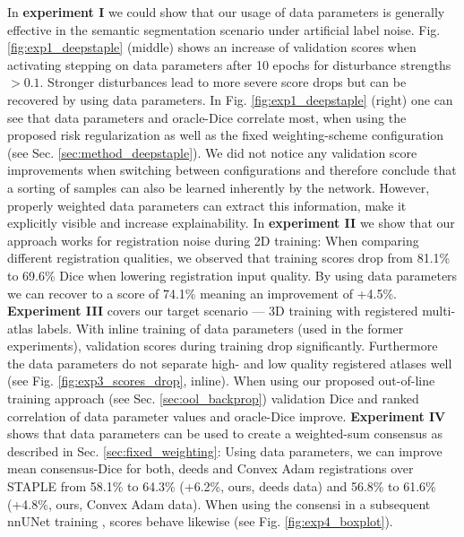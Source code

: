     \label{sec:results}
    In \textbf{experiment I} we could show that our usage of data parameters is generally effective in the semantic segmentation scenario under artificial label noise.
    Fig. \ref{fig:exp1_deepstaple} (middle) shows an increase of validation scores when activating stepping on data parameters after 10 epochs for disturbance strengths \(>0.1\). Stronger disturbances lead to more severe score drops but can be recovered by using data parameters.
    In Fig. \ref{fig:exp1_deepstaple} (right) one can see that data parameters and oracle-Dice correlate most, when using the proposed risk regularization as well as the fixed weighting-scheme configuration (see Sec. \ref{sec:method_deepstaple}). We did not notice any validation score improvements when switching between configurations and therefore conclude that a sorting of samples can also be learned inherently by the network. However, properly weighted data parameters can extract this information, make it explicitly visible and increase explainability.
    In \textbf{experiment II} we show that our approach works for registration noise during 2D training: When comparing different registration qualities, we observed that training scores drop from 81.1\% to 69.6\% Dice when lowering registration input quality. By using data parameters we can recover to a score of 74.1\% meaning an improvement of +4.5\%.
    \textbf{Experiment III} covers our target scenario --- 3D training with registered multi-atlas labels. With inline training of data parameters (used in the former experiments), validation scores during training drop significantly. Furthermore the data parameters do not separate high- and low quality registered atlases well (see Fig. \ref{fig:exp3_scores_drop}, inline). When using our proposed out-of-line training approach (see Sec. \ref{sec:ool_backprop}) validation Dice and ranked correlation of data parameter values and oracle-Dice improve.
    \textbf{Experiment IV} shows that data parameters can be used to create a weighted-sum consensus as described in Sec. \ref{sec:fixed_weighting}: Using data parameters, we can improve mean consensus-Dice for both, deeds and Convex Adam registrations over STAPLE \citep{warfield2004simultaneous} from 58.1\% to 64.3\% (+6.2\%, ours, deeds data) and 56.8\% to 61.6\% (+4.8\%, ours, Convex Adam data).
    When using the consensi in a subsequent nnUNet training \citep{isensee2021nnu}, scores behave likewise (see Fig. \ref{fig:exp4_boxplot}).
